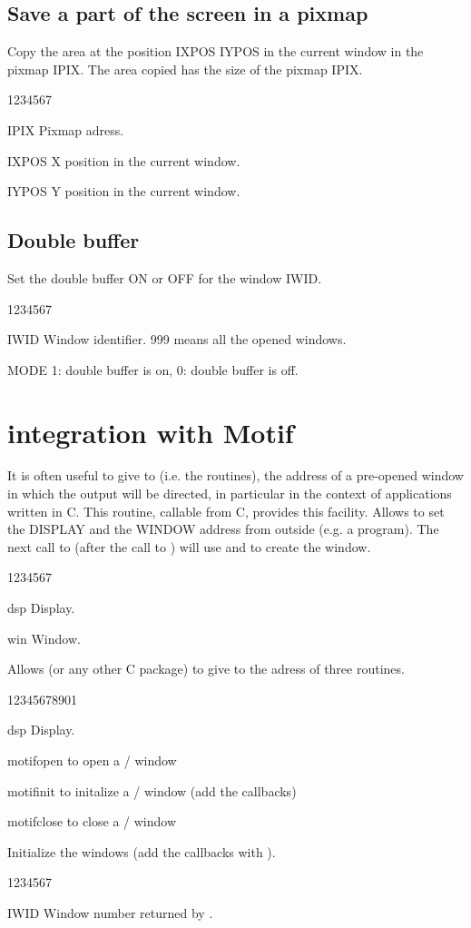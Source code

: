 \subsection{Save a part of the screen in a pixmap}
%
\Action
Copy the area at the position IXPOS IYPOS in the current
window in the pixmap IPIX. The area copied has the size
of the pixmap IPIX.
\begin{DLtt}{1234567}
\item[IPIX] Pixmap adress.
\item[IXPOS] X position in the current window.
\item[IYPOS] Y position in the current window.
\end{DLtt}


\subsection{Double buffer}
%
Set the double buffer ON or OFF for the window IWID.
\begin{DLtt}{1234567}
\item[IWID] Window identifier. 999 means all the opened windows.
\item[MODE] 1: double buffer is on, 0: double buffer is off.
\end{DLtt}
%
%

\section{\HIGZ{} integration with Motif}

It is often useful to give to \HIGZ{} (i.e. the  routines), the 
address of
a pre-opened window in which the \HIGZ{} output will be directed,
in particular in the context of \MOTIF{} applications written in C. This
routine, callable from C, provides this facility.
\Action
Allows to set the DISPLAY and the WINDOW address
from outside \HIGZ{} (e.g. a \MOTIF{} program).
The next call to  (after the call to )
will use  and  to create the window.
\Pdesc
\begin{DLtt}{1234567}
\item[dsp] Display.
\item[win] Window.
\end{DLtt}


Allows \KUIP{} (or any other C package) to give to \HIGZ{} the adress of three
routines.
\begin{DLtt}{12345678901}
\item[dsp] Display.
\item[motifopen] to open a \KUIP{}/\MOTIF{} window
\item[motifinit] to initalize a \KUIP{}/\MOTIF{} window (add the callbacks)
\item[motifclose] to close a \KUIP{}/\MOTIF{} window
\end{DLtt}

Initialize the \MOTIF{} windows (add the callbacks with ).
\begin{DLtt}{1234567}
\item[IWID] Window number returned by .
\end{DLtt}
